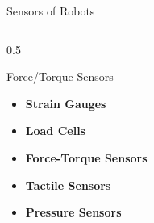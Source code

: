 \documentclass[10pt]{beamer}
\begin{document}
\begin{frame}{Sensors of Robots}
\begin{columns}
        \begin{column}{0.5\textwidth}
            \begin{exampleblock}{Force/Torque Sensors}
                \begin{itemize}
                    \item \textbf{Strain Gauges}
                    \item \textbf{Load Cells}
                    \item \textbf{Force-Torque Sensors}
                    \item \textbf{Tactile Sensors}
                    \item \textbf{Pressure Sensors}
                \end{itemize}
            \end{exampleblock}
        \end{column}
    \end{columns}
\end{frame}
\end{document}
